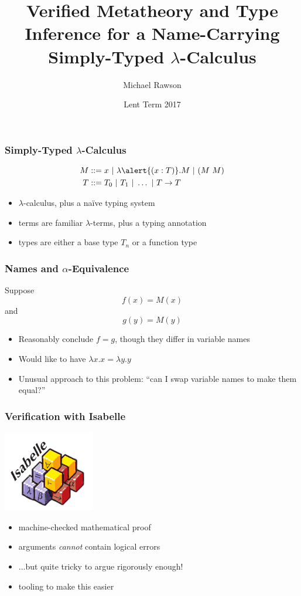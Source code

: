 \documentclass{beamer}
\title{Verified Metatheory and Type Inference for a Name-Carrying Simply-Typed $\lambda$-Calculus}
\author{Michael Rawson}
\date{Lent Term 2017}
\begin{document}
\frame{\titlepage}

\begin{frame}
\frametitle{Simply-Typed $\lambda$-Calculus}
\begin{align*}
M &::= x\ |\ \lambda \alert{(x : T)}.M\ |\ (M\ M)\\
T &::= T_0\ |\ T_1\ |\ \ldots\ |\ T \to T
\end{align*}

\begin{itemize}
\item $\lambda$-calculus, plus a na\"ive typing system
\item terms are familiar $\lambda$-terms, plus a \alert{typing annotation}
\item types are either a base type $T_n$ or a function type
\end{itemize}
\end{frame}

\begin{frame}
\frametitle{Names and $\alpha$-Equivalence}
Suppose
$$
f(x) = M(x)
$$
and
$$
g(y) = M(y)
$$

\begin{itemize}
\item Reasonably conclude $f = g$, though they differ in variable names
\item Would like to have $\lambda x.x = \lambda y.y$
\item Unusual approach to this problem: ``can I swap variable names to make them equal?''
\end{itemize}
\end{frame}

\begin{frame}
\frametitle{Verification with Isabelle}
\begin{center}
\includegraphics[width=0.3\textwidth]{logo}
\end{center}
\begin{itemize}
\item machine-checked mathematical proof
\item arguments \emph{cannot} contain logical errors
\item ...but quite tricky to argue rigorously enough!
\item tooling to make this easier
\end{itemize}
\end{frame}
\end{document}
